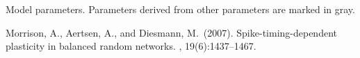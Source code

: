\documentclass[10pt,a4paper,twoside,american]{article}
\newcommand{\dtsim}{\Delta t}
\newcommand{\ms}{\,\text{ms}}
\begin{document}
\begin{table}[H]
  \caption{Model parameters. Parameters derived from other parameters are marked in gray.}
  \label{tab:parameters}
\end{table}
\begin{thebibliography}{}
  Morrison, A., Aertsen, A., and Diesmann, M.~(2007).
  \newblock Spike-timing-dependent plasticity in balanced random networks.
  , 19(6):1437--1467.
\end{thebibliography}

\end{document}
